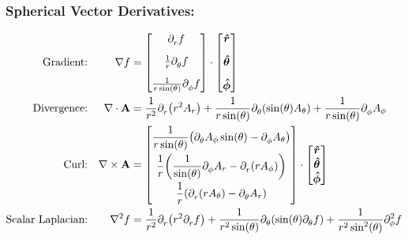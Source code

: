     \subsubsection*{Spherical Vector Derivatives:}
    \length[0.7cm]
    \begin{align*}
    \text{Gradient:}&&
    \nabla f &=
    \left[
    \begin{matrix}
    \pder*{r}f
    \\[0.3 cm]
    \frac{1}{r} \pder*{\theta}f
    \\[0.3 cm]
    \frac{1}{r \sin(\theta)}\pder*{\phi}f
    \end{matrix}\right]
    \cdot
    \left[
    \begin{matrix}
    \e{r}
    \\[0.3 cm]
    \e{\theta}
    \\[0.3 cm]
    \e{\phi}
    \end{matrix}\right]
    \\
    \text{Divergence:}&&
    \nabla \cdot \vb{A} &= \oo{r^2} \pder*{r}\qty(r^2A_r) + \oo{r \sin(\theta)} \pder*{\theta} \qty(\sin(\theta)A_\theta) + \oo{r \sin(\theta)} \pder*{\phi}A_\phi 
    \\
    \text{Curl:}&&
    \nabla \times \vb{A} &= 
    \left[
    \begin{matrix}
    \mathlarger{\frac{1}{r\sin(\theta)} \qty(\pder*{\theta}A_\phi\sin(\theta)-\pder*{\phi}A_\theta)}
    \\[0.3 cm]
    \mathlarger{\oo{r}\qty(\oo{\sin(\theta)}\pder*{\phi}A_r-\pder*{r}\qty(r A_{\phi}))}
    \\[0.3 cm]
    \mathlarger{\frac{1}{r}\qty(\pder*{r}\qty(rA_{\theta}) - \pder*{\theta}A_r)}
    \end{matrix}\right]
    \cdot
    \left[
    \begin{matrix}
    \e{r}
    \\
    \e{\theta} 
    \\
    \e{\phi}
    \end{matrix}\right]
    \\
    \text{Scalar Laplacian:}&&
    \nabla^2 f 
    &= \frac{1}{r^2} \pder*{r} \qty(r^2 \pder*{r}f) + \frac{1}{r^2 \sin(\theta)} \pder*{\theta} \qty(\sin(\theta)\pder*{\theta}f) +\frac{1}{r^2 \sin^2(\theta)} \pder*[2]{\phi}f
    \end{align*}
    \length


\newpage
